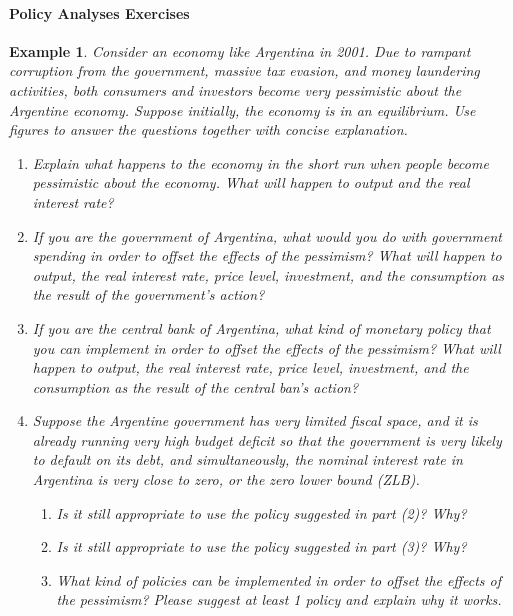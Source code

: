 \documentclass[12pt]{article}
\newtheorem{example}{Example}
\begin{document}
\paragraph{Policy Analyses Exercises}
\begin{example}
    Consider an economy like Argentina in 2001. Due to rampant corruption from the government, massive tax evasion, and money laundering activities, both consumers and investors become very pessimistic about the Argentine economy. Suppose initially, the economy is in an equilibrium. Use figures to answer the questions together with concise explanation.
    \begin{enumerate}[label=(\arabic*)]
        \item Explain what happens to the economy in the short run when people become pessimistic about the economy. What will happen to output and the real interest rate?
        \item If you are the government of Argentina, what would you do with government spending in order to offset the effects of the pessimism? What will happen to output, the real interest rate, price level, investment, and the consumption as the result of the government's action?
        \item If you are the central bank of Argentina, what kind of monetary policy that you can implement in order to offset the effects of the pessimism? What will happen to output, the real interest rate, price level, investment, and the consumption as the result of the central ban's action?
        \item Suppose the Argentine government has very limited fiscal space, and it is already running very high budget deficit so that the government is very likely to default on its debt, and simultaneously, the nominal interest rate in Argentina is very close to zero, or the zero lower bound (ZLB). 
        \begin{enumerate}[label=\alph*.]
            \item Is it still appropriate to use the policy suggested in part (2)? Why?
            \item Is it still appropriate to use the policy suggested in part (3)? Why?
            \item What kind of policies can be implemented in order to offset the effects of the pessimism? Please suggest at least 1 policy and explain why it works.
        \end{enumerate}
    \end{enumerate}
\end{example}
\end{document}
